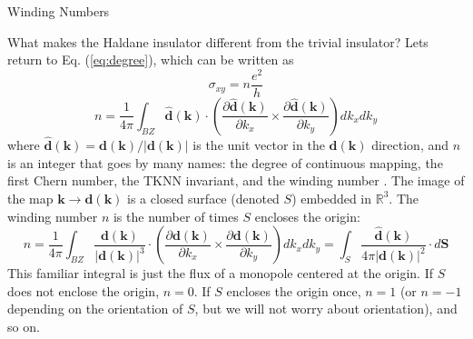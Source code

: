 \documentclass[a4paper,12pt]{article}
\renewcommand{\vec}[1]{\boldsymbol{\mathbf{#1}}}
\begin{document}
\begin{section}{Winding Numbers}

What makes the Haldane insulator different from the trivial insulator?  Lets return to Eq. (\ref{eq:degree}), which can be written as
\begin{equation}
\sigma_{xy}=n \frac{e^2}{h}
\end{equation}
\begin{equation}
n=\frac{1}{4 \pi} \int_{BZ} \hat{\vec{d}}(\vec{k}) \cdot \left( \frac{\partial \hat{\vec{d}}(\vec{k})}{\partial k_x} \times \frac{\partial \hat{\vec{d}}(\vec{k})}{\partial k_y}\right) dk_x dk_y
\label{eq:winding}
\end{equation}
where $\hat{\vec{d}}(\vec{k})=\vec{d}(\vec{k})/|\vec{d}(\vec{k})|$ is the unit vector in the $\vec{d}(\vec{k})$ direction, and $n$ is an integer that goes by many names: the degree of continuous mapping, the first Chern number, the TKNN invariant, and the winding number \cite{hasan_kane_review}.  The image of the map $\vec{k} \rightarrow \vec{d}(\vec{k})$ is a closed surface (denoted $S$) embedded in $\mathbb{R}^3$.  The winding number $n$ is the number of times $S$ encloses the origin:
\begin{equation}
n= \frac{1}{4 \pi} \int_{BZ} \frac{\vec{d}(\vec{k})}{|\vec{d}(\vec{k})|^3}\cdot \left( \frac{\partial \vec{d}(\vec{k})}{\partial k_x} \times \frac{\partial \vec{d}(\vec{k})}{\partial k_y}\right) dk_x dk_y = \int_S \frac{\hat{\vec{d}}(\vec{k})}{4 \pi |\vec{d}(\vec{k})|^2} \cdot d\vec{S}
\end{equation}
This familiar integral is just the flux of a monopole centered at the origin.  If $S$ does not enclose the origin, $n=0$.  If $S$ encloses the origin once, $n=1$ (or $n=-1$ depending on the orientation of $S$, but we will not worry about orientation), and so on.



\end{section}
\end{document}
